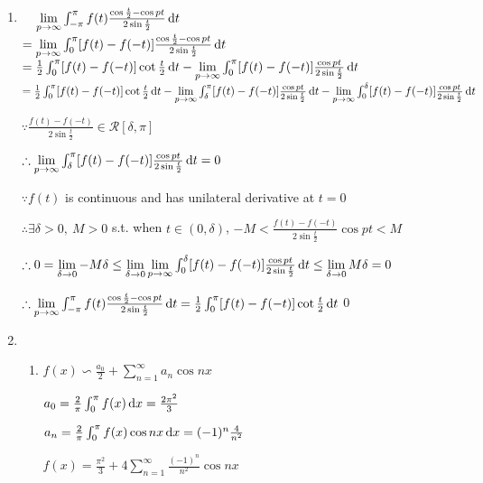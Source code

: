 \begin{enumerate}[1]
    \item 
    $\phantom{= }\, \lim \limits_{p \rightarrow \infty}\int_{-\pi}^{\pi}f(t)\frac{\cos\frac{t}{2}-\cos pt}{2\sin\frac{t}{2}}\dif t$\\
    $=\lim \limits_{p\rightarrow\infty}\int_{0}^{\pi}[f(t)-f(-t)]\frac{\cos\frac{t}{2}-\cos pt}{2\sin\frac{t}{2}}\dif t$\\
    $= \frac{1}{2}\int_{0}^{\pi}[f(t)-f(-t)]\cot \frac{t}{2}\dif t -\lim \limits_{p\rightarrow\infty}\int_{0}^{\pi}[f(t)-f(-t)]\frac{\cos pt}{2\sin\frac{t}{2}}\dif t$\\
    $= \frac{1}{2}\int_{0}^{\pi}[f(t)-f(-t)]\cot \frac{t}{2}\dif t -\lim \limits_{p \rightarrow \infty} \int_{\delta}^{\pi}[f(t)-f(-t)]\frac{\cos pt}{2\sin\frac{t}{2}}\dif t -\lim \limits_{p \rightarrow \infty} \int_{0}^{\delta}[f(t)-f(-t)]\frac{\cos pt}{2\sin\frac{t}{2}}\dif t$
    \par $\because \frac{f(t)-f(-t)}{2\sin\frac{t}{2}} \in \mathcal{R}[\delta,\pi]$
    \par $\therefore \lim \limits_{p \rightarrow \infty} \int_{\delta}^{\pi}[f(t)-f(-t)]\frac{\cos pt}{2\sin\frac{t}{2}}\dif t=0$
    \par $\because f(t)$ is continuous and has unilateral derivative at $t=0$
    \par $\therefore \exists \delta > 0,\ M>0$ s.t. when $t \in (0,\delta)$, $-M<\frac{f(t)-f(-t)}{2\sin\frac{t}{2}}\cos pt < M $
    \par $\therefore 0=\lim \limits_{\delta \rightarrow 0} -M\delta \leq  \lim \limits_{\delta \rightarrow 0} \lim \limits_{p \rightarrow \infty}  \int_{0}^{\delta}[f(t)-f(-t)]\frac{\cos pt}{2\sin\frac{t}{2}}\dif t\leq \lim \limits_{\delta \rightarrow 0}M\delta =0$
    \par $\therefore  \lim \limits_{p \rightarrow \infty}\int_{-\pi}^{\pi}f(t)\frac{\cos\frac{t}{2}-\cos pt}{2\sin\frac{t}{2}}\dif t = \frac{1}{2}\int_{0}^{\pi}[f(t)-f(-t)]\cot \frac{t}{2}\dif t$\qed

    \item 
    
    \begin{enumerate}[(1)]
        \item 
        \label{(1)}
        \par $f(x)\backsim\frac{a_0}{2}+\sum \limits_{n=1}^{\infty}a_n\cos nx $
        \par $a_0=\frac{2}{\pi}\int_0^{\pi}f(x)\dif x=\frac{2\pi^2}{3}$
        \par $a_n=\frac{2}{\pi}\int_0^{\pi}f(x)\cos nx\dif x=(-1)^n\frac{4}{n^2}$
        \par $f(x) =  \frac{\pi^2}{3} + 4\sum \limits_{n=1}^{\infty} \frac{(-1)^n}{n^2} \cos nx$


\end{enumerate}
\end{enumerate}
